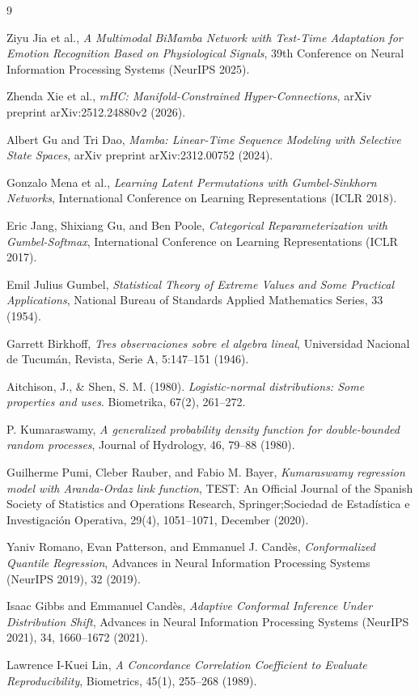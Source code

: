 \documentclass[11pt,a4paper]{article}
\begin{document}
	\newpage
	\begin{thebibliography}{9}
		
		Ziyu Jia et al., \emph{A Multimodal BiMamba Network with Test-Time Adaptation for Emotion Recognition Based on Physiological Signals}, 39th Conference on Neural Information Processing Systems (NeurIPS 2025).
		
		Zhenda Xie et al., \emph{mHC: Manifold-Constrained Hyper-Connections}, arXiv preprint arXiv:2512.24880v2 (2026).
		
		Albert Gu and Tri Dao, \emph{Mamba: Linear-Time Sequence Modeling with Selective State Spaces}, arXiv preprint arXiv:2312.00752 (2024).
		
		Gonzalo Mena et al., \emph{Learning Latent Permutations with Gumbel-Sinkhorn Networks}, International Conference on Learning Representations (ICLR 2018).
		
		Eric Jang, Shixiang Gu, and Ben Poole, \emph{Categorical Reparameterization with Gumbel-Softmax}, International Conference on Learning Representations (ICLR 2017).
		
		Emil Julius Gumbel, \emph{Statistical Theory of Extreme Values and Some Practical Applications}, National Bureau of Standards Applied Mathematics Series, 33 (1954).
		
		Garrett Birkhoff, \emph{Tres observaciones sobre el algebra lineal}, Universidad Nacional de Tucum\'{a}n, Revista, Serie A, 5:147--151 (1946).
		
		Aitchison, J., \& Shen, S. M. (1980). \emph{Logistic-normal distributions: Some properties and uses}. Biometrika, 67(2), 261--272.
		
		P. Kumaraswamy, \emph{A generalized probability density function for double-bounded random processes}, Journal of Hydrology, 46, 79--88 (1980).
		
		Guilherme Pumi, Cleber Rauber, and Fabio M. Bayer, \emph{Kumaraswamy regression model with Aranda-Ordaz link function}, TEST: An Official Journal of the Spanish Society of Statistics and Operations Research, Springer;Sociedad de Estadística e Investigación Operativa, 29(4), 1051--1071, December (2020).
		
		Yaniv Romano, Evan Patterson, and Emmanuel J. Candès, \emph{Conformalized Quantile Regression}, Advances in Neural Information Processing Systems (NeurIPS 2019), 32 (2019).
		
		Isaac Gibbs and Emmanuel Candès, \emph{Adaptive Conformal Inference Under Distribution Shift}, Advances in Neural Information Processing Systems (NeurIPS 2021), 34, 1660--1672 (2021).

		Lawrence I-Kuei Lin, \emph{A Concordance Correlation Coefficient to Evaluate Reproducibility}, Biometrics, 45(1), 255--268 (1989).
	\end{thebibliography}
	
\end{document}
